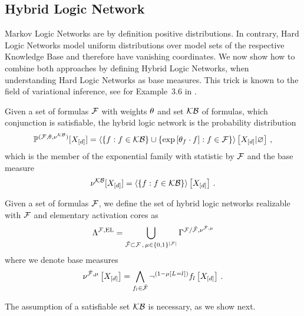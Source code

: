\subsection{Hybrid Logic Network}

Markov Logic Networks are by definition positive distributions.
In contrary, Hard Logic Networks model uniform distributions over model sets of the respective Knowledge Base and therefore have vanishing coordinates.
We now show how to combine both approaches by defining Hybrid Logic Networks, when understanding Hard Logic Networks as base measures.
This trick is known to the field of variational inference, see for Example~3.6 in \cite{wainwright_graphical_2008}. 

\begin{definition}\label{def:hln}
	Given a set of formulas $\mathcal{F}$ with weights $\theta$ and set $\mathcal{KB}$ of formulas, which conjunction is satisfiable, the hybrid logic network is the probability distribution
	\begin{align*}
		\mathbb{P}^{(\mathcal{F},\theta,\nu^{\mathcal{KB}})}[X_{[d]}] 
		= \left\langle 
		\{f : f\in\mathcal{KB}\} \cup \{\mathrm{exp}\left[\theta_{f}\cdot f\right] : f\in\mathcal{F}\}
		\right\rangle \left[ X_{[d]} | \varnothing \right] \, ,
	\end{align*}
	which is the member of the exponential family with statistic by $\mathcal{F}$ and the base measure
		\[ \nu^{\mathcal{KB}}[X_{[d]}] = \left\langle \{f : f \in \mathcal{KB}\}\right\rangle \left[ X_{[d]} \right] \, .\]
		
	Given a set of formulas $\mathcal{F}$, we define the set of hybrid logic networks realizable with $\mathcal{F}$ and elementary activation cores as
	\begin{align*}
		\Lambda^{\mathcal{F},\mathrm{EL}} 
		= \bigcup_{\tilde{\mathcal{F}}\subset\mathcal{F} \, , \, \mu\in\{0,1\}^{\left|\mathcal{F}\right|}}
		\Gamma^{\mathcal{F}/\tilde{\mathcal{F}},\nu^{\tilde{\mathcal{F}},\mu}}
	\end{align*}
	where we denote base measures
	\begin{align*}
		\nu^{\tilde{\mathcal{F}},\mu}\left[X_{[d]}\right]
		= \bigwedge_{f_{l}\in\tilde{\mathcal{F}}} \lnot^{(1-\mu\left[L_{}=l_{}\right])} f_{l}\left[X_{[d]}\right] \, . 
	\end{align*}
\end{definition}

The assumption of a satisfiable set $\mathcal{KB}$ is necessary, as we show next.

